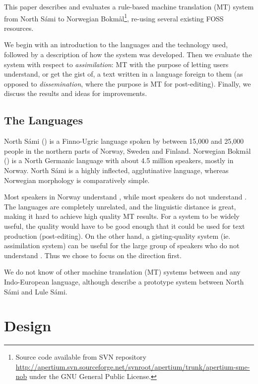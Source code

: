 \documentclass{book}
\begin{document}
This paper describes and evaluates a rule-based machine translation
(MT) system from North S\'{a}mi to Norwegian
Bokm{\aa}l\footnote{Source code available from SVN repository\\
  \href{http://apertium.svn.sourceforge.net/svnroot/apertium/trunk/apertium-sme-nob}{http://apertium.svn.sourceforge.net/svnroot/apertium/trunk/apertium-sme-nob}
  under the GNU General Public License.}, re-using several existing
FOSS resources.

We begin with an introduction to the languages and the technology
used, followed by a description of how the system was developed. Then
we evaluate the system with respect to \textit{assimilation}: MT with
the purpose of letting users understand, or get the gist of, a text
written in a language foreign to them (as opposed to
\textit{dissemination}, where the purpose is MT for post-editing).
Finally, we discuss the results and ideas for improvements.


\subsection{The Languages}
North S\'{a}mi (\sme{}) is a Finno-Ugric language spoken by between 
15,000 and 25,000 people in the northern parts of Norway, Sweden and
Finland. Norwegian Bokm{\aa}l (\nob{}) is a North Germanic language
with about 4.5 million speakers, mostly in Norway. North S\'{a}mi %
is a highly inflected, agglutinative language, whereas Norwegian
morphology is comparatively simple.

Most \sme{} speakers in Norway understand \nob{}, while most \nob{}
speakers do not understand \sme{}. The languages are completely
unrelated, and the linguistic distance is great, making it hard to
achieve high quality MT results. For a \nobsme{} system to be widely
useful, the quality would have to be good enough that it could be used
for text production (post-editing). On the other hand, a \smenob{}
gisting-quality system (ie. assimilation system) can be useful for the
large group of \nob{} speakers who do not understand \sme{}. Thus we
chose to focus on the \smenob{} direction first.

We do not know of other machine translation (MT) systems between \sme{}
and any Indo-European language, although \citet{tyers2009dpm} describe %
a prototype system between North S\'{a}mi and Lule S\'{a}mi.



\section{Design}
 \label{sec:design}
\end{document}
